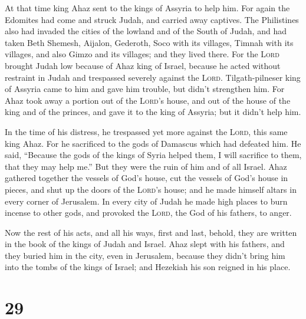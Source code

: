  At that time king Ahaz sent to the kings of Assyria to
help him.  For again the Edomites had come and struck
Judah, and carried away captives.  The Philistines also
had invaded the cities of the lowland and of the South of Judah, and had
taken Beth Shemesh, Aijalon, Gederoth, Soco with its villages, Timnah
with its villages, and also Gimzo and its villages; and they lived
there.  For the \textsc{Lord} brought Judah low because
of Ahaz king of Israel, because he acted without restraint in Judah and
trespassed severely against the \textsc{Lord}. 
Tilgath-pilneser king of Assyria came to him and gave him trouble, but
didn't strengthen him.  For Ahaz took away a portion out
of the \textsc{Lord}'s house, and out of the house of the king and of
the princes, and gave it to the king of Assyria; but it didn't help him.

 In the time of his distress, he trespassed yet more
against the \textsc{Lord}, this same king Ahaz.  For he
sacrificed to the gods of Damascus which had defeated him. He said,
``Because the gods of the kings of Syria helped them, I will sacrifice
to them, that they may help me.'' But they were the ruin of him and of
all Israel.  Ahaz gathered together the vessels of God's
house, cut the vessels of God's house in pieces, and shut up the doors
of the \textsc{Lord}'s house; and he made himself altars in every corner
of Jerusalem.  In every city of Judah he made high places
to burn incense to other gods, and provoked the \textsc{Lord}, the God
of his fathers, to anger.

 Now the rest of his acts, and all his ways, first and
last, behold, they are written in the book of the kings of Judah and
Israel.  Ahaz slept with his fathers, and they buried him
in the city, even in Jerusalem, because they didn't bring him into the
tombs of the kings of Israel; and Hezekiah his son reigned in his place.

\hypertarget{section-28}{%
\section{29}\label{section-28}}

